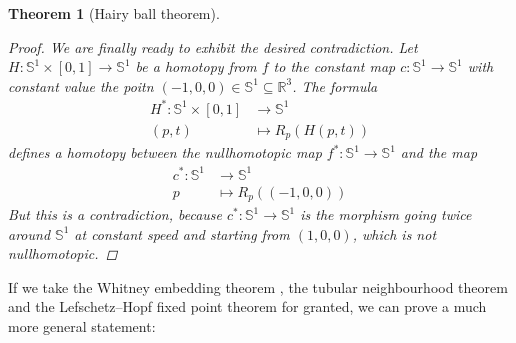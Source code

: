 \documentclass[A4paper, 12pt, british, reqno]{amsart}
\newcommand{\R}{\mathbb{R}} %
\newcommand{\bbS}{\mathbb{S}}
\theoremstyle{plain}
\newtheorem{thm}{Theorem}[section]
\theoremstyle{definition}
\theoremstyle{remark}
\theoremstyle{plain}
\theoremstyle{definition}
\theoremstyle{remark}
\theoremstyle{plain}
\theoremstyle{definition}
\theoremstyle{remark}
\begin{document}
\begin{thm}[Hairy ball theorem]
\begin{proof}
	We are finally ready to exhibit the desired contradiction.
	Let $H\colon \bbS^{1}\times [0,1]\to \bbS^{1}$ be a homotopy from $f$ to the constant map $c\colon \bbS^{1}\to \bbS^{1}$ with constant value the poitn $(-1,0,0)\in \bbS^{1}\subseteq \R^{3}$.
	The formula
	\begin{align*}
	    H^{*}\colon \bbS^{1}\times [0,1] & \longrightarrow \bbS^{1} \\
	    (p,t) & \longmapsto R_{p}(H(p,t))
	\end{align*}
	defines a homotopy between the nullhomotopic map $f^{*}\colon \bbS^{1}\to \bbS^{1}$ and the map
	\begin{align*}
	    c^{*}\colon \bbS^{1} & \longrightarrow \bbS^{1} \\
	    p  & \longmapsto R_{p}((-1,0,0))
	\end{align*}
	But this is a contradiction, because $c^{*}\colon \bbS^{1}\to \bbS^{1}$ is the morphism going twice around $\bbS^{1}$ at constant speed and starting from $(1,0,0)$, which is not nullhomotopic.
    \end{proof}
\end{thm}

If we take the Whitney embedding theorem \cite[Theorem II.10.7]{bre93}, the tubular neighbourhood theorem \cite[Theorem II.11.4]{bre93} and the Lefschetz--Hopf fixed point theorem \cite[Theorem IV.23.4]{bre93} for granted, we can prove a much more general statement:
\end{document}

